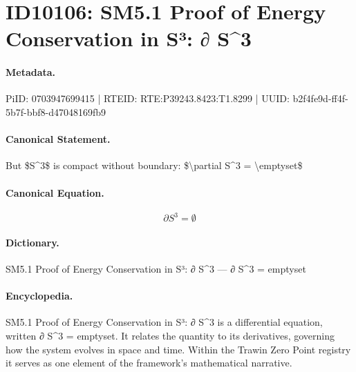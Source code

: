 \section*{ID10106: SM5.1 Proof of Energy Conservation in S³: ∂ S\textasciicircum{}3}
\paragraph{Metadata.}
PiID: 0703947699415 | RTEID: RTE:P39243.8423:T1.8299 | UUID: b2f4fe9d-ff4f-5b7f-bbf8-d47048169fb9

\paragraph{Canonical Statement.}
But \$S\textasciicircum{}3\$ is compact without boundary: \$\textbackslash{}partial S\textasciicircum{}3 = \textbackslash{}emptyset\$

\paragraph{Canonical Equation.}
\[
\partial S^3 = \emptyset
\]

\paragraph{Dictionary.}
SM5.1 Proof of Energy Conservation in S³: ∂ S\textasciicircum{}3 — ∂ S\textasciicircum{}3 = emptyset

\paragraph{Encyclopedia.}
SM5.1 Proof of Energy Conservation in S³: ∂ S\textasciicircum{}3 is a differential equation, written ∂ S\textasciicircum{}3 = emptyset. It relates the quantity to its derivatives, governing how the system evolves in space and time. Within the Trawin Zero Point registry it serves as one element of the framework's mathematical narrative.
